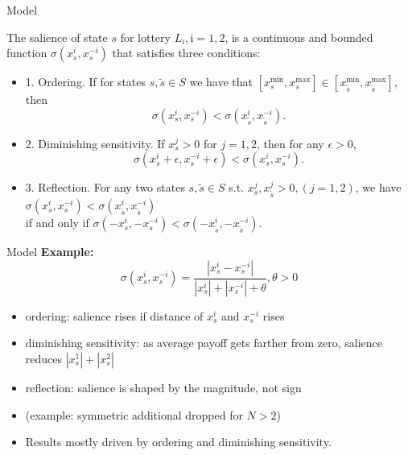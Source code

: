 \documentclass[11pt,aspectratio=169]{beamer}
\begin{document}
\begin{frame}{Model}
    \begin{definition}[1]
        The salience of state $s$ for lottery $L_i, \mathrm{i}=1,2$, is a continuous and bounded function $\sigma\left(x_s^i, x_s^{-i}\right)$ that satisfies three conditions:\\
        \begin{itemize}
            \item 1. Ordering. If for states $s, \tilde{s} \in S$ we have that $\left[x_s^{\min }, x_s^{\max }\right] \in \left[x_{\tilde{s}}^{\min }, x_{\tilde{s}}^{\max }\right]$, then
    $$
    \sigma\left(x_s^i, x_s^{-i}\right)<\sigma\left(x_{\tilde{s}}^i, x_{\tilde{s}}^{-i}\right) .
    $$ 
            \item 2. Diminishing sensitivity. If $x_s^j>0$ for $j=1,2$, then for any $\epsilon>0$,
$$
\sigma\left(x_s^i+\epsilon, x_s^{-i}+\epsilon\right)<\sigma\left(x_s^i, x_s^{-i}\right) .
$$
            \item 3. Reflection. For any two states $s, \tilde{s} \in S$ s.t. $x_s^j, x_{\tilde{s}}^j>0, (j=1,2)$, we have\\
            $\sigma\left(x_s^i, x_s^{-i}\right)<\sigma\left(x_{\tilde{s}}^i, x_{\tilde{s}}^{-i}\right)$\\
            if and only if $\sigma\left(-x_s^i,-x_s^{-i}\right)<\sigma\left(-x_{\tilde{s}}^i,-x_{\tilde{s}}^{-i}\right)$.
        \end{itemize}
    \end{definition}
\end{frame}

\begin{frame}{Model}
    \textbf{Example:}\\
    $$
    \sigma\left(x_s^i, x_s^{-i}\right)=\frac{\left|x_s^i-x_s^{-i}\right|}{\left|x_s^i\right|+\left|x_s^{-i}\right|+\theta}, \theta>0
    $$ 
    \begin{itemize}
        \item ordering: salience rises if distance of  $x_s^i$ and $x_s^{-i}$ rises\medskip
        \item diminishing sensitivity: as average payoff gets farther from zero, salience reduces $\left|x_s^1\right|+\left|x_s^2\right|$\medskip
        \item reflection: salience is shaped by the magnitude, not sign\medskip
        \item (example: symmetric additional dropped for $N>2$)\medskip
        \item Results mostly driven by ordering and diminishing sensitivity.\medskip
	\end{itemize}
\end{frame}
\end{document}
